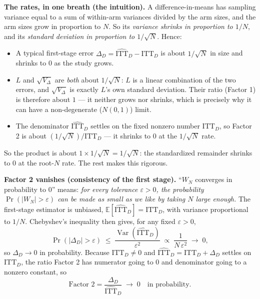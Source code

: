 \documentclass[11pt]{article}
\newcommand{\ITTD}{\mathrm{ITT}_D}
\newcommand{\hITTD}{\widehat{\mathrm{ITT}}_D}
\newcommand{\E}{\mathbb{E}}
\begin{document}
\bigskip
\noindent\textbf{The rates, in one breath (the intuition).}
A difference-in-means has sampling variance equal to a sum of within-arm variances
divided by the arm sizes, and the arm sizes grow in proportion to $N$. So its
\emph{variance shrinks in proportion to $1/N$}, and its \emph{standard deviation in
proportion to $1/\sqrt{N}$}. Hence:
\begin{itemize}
\item A typical first-stage error $\Delta_D = \hITTD - \ITTD$ is about
$1/\sqrt{N}$ in size and shrinks to $0$ as the study grows.
\item $L$ and $\sqrt{V_\Delta}$ are \emph{both} about $1/\sqrt{N}$: $L$ is a linear
combination of the two errors, and $\sqrt{V_\Delta}$ is exactly $L$'s own standard
deviation. Their ratio (Factor 1) is therefore about $1$ --- it neither grows nor
shrinks, which is precisely why it can have a non-degenerate ($N(0,1)$) limit.
\item The denominator $\hITTD$ settles on the fixed nonzero number $\ITTD$, so
Factor 2 is about $(1/\sqrt{N})/\ITTD$ --- it shrinks to $0$ at the $1/\sqrt{N}$
rate.
\end{itemize}
So the product is about $1 \times 1/\sqrt{N} = 1/\sqrt{N}$: the standardized
remainder shrinks to $0$ at the root-$N$ rate. The rest makes this rigorous.

\bigskip
\noindent\textbf{Factor 2 vanishes (consistency of the first stage).}
``$W_N$ converges in probability to $0$'' means: \emph{for every tolerance
$\varepsilon > 0$, the probability $\Pr(\lvert W_N\rvert > \varepsilon)$ can be made
as small as we like by taking $N$ large enough.} The first-stage estimator is
unbiased, $\E[\hITTD] = \ITTD$, with variance proportional to $1/N$. Chebyshev's
inequality then gives, for any fixed $\varepsilon>0$,
\begin{equation*}
\Pr\!\left(\lvert \Delta_D\rvert > \varepsilon\right)
\;\le\; \frac{\operatorname{Var}(\hITTD)}{\varepsilon^{2}}
\;\propto\; \frac{1}{N\,\varepsilon^{2}} \;\longrightarrow\; 0 ,
\end{equation*}
so $\Delta_D \to 0$ in probability. Because $\ITTD \neq 0$ and
$\hITTD = \ITTD + \Delta_D$ settles on $\ITTD$, the ratio Factor 2 has numerator
going to $0$ and denominator going to a nonzero constant, so
\begin{equation*}
\text{Factor 2} = \frac{\Delta_D}{\hITTD} \;\longrightarrow\; 0
\quad\text{in probability.}
\end{equation*}
\end{document}
